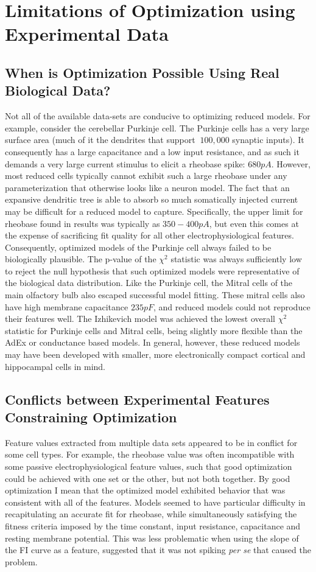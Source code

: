 
\section{Limitations of Optimization using Experimental Data}
\label{sec:limitations-of-optimization}

\subsection{When is Optimization Possible Using Real Biological Data?}
Not all of the available data-sets are conducive to optimizing reduced models.
For example, consider the cerebellar Purkinje cell.
The Purkinje cells has a very large surface area (much of it the dendrites that support $~100,000$ synaptic inputs).
It consequently has a large capacitance and a low input resistance, and as such it demands a very large current stimulus to elicit a rheobase spike: $680pA$.
However, most reduced cells typically cannot exhibit such a large rheobase under any parameterization that otherwise looks like a neuron model.
The fact that an expansive dendritic tree is able to absorb so much somatically injected current may be difficult for a reduced model to capture.
Specifically, the upper limit for rheobase found in results was typically as $350-400pA$, but even this comes at the expense of sacrificing fit quality for all other electrophysiological features.
Consequently, optimized models of the Purkinje cell always failed to be biologically plausible.
The p-value of the $\chi^{2}$ statistic was always sufficiently low to reject the null hypothesis that such optimized models were representative of the biological data distribution.
Like the Purkinje cell, the Mitral cells of the main olfactory bulb also escaped successful model fitting.
These mitral cells also have high membrane capacitance $235pF$, and reduced models could not reproduce their features well.  
The Izhikevich model was achieved the lowest overall $\chi^{2}$ statistic for Purkinje cells and Mitral cells, being slightly more flexible than the AdEx or  conductance based models.
In general, however, these reduced models may have been developed with smaller, more electronically compact cortical and hippocampal cells in mind.

\subsection{Conflicts between Experimental Features Constraining Optimization}
Feature values extracted from multiple data sets appeared to be in conflict for some cell types.
For example, the rheobase value was often incompatible with some passive electrophysiological feature values, such that good optimization could be achieved with one set or the other, but not both together.
By good optimization I mean that the optimized model exhibited behavior that was consistent with all of the features.
Models seemed to have particular difficulty in recapitulating an accurate fit for rheobase, while simultaneously satisfying the fitness criteria imposed by the time constant, input resistance, capacitance and resting membrane potential.
This was less problematic when using the slope of the FI curve as a feature, suggested that it was not spiking \emph{per se} that caused the problem.

